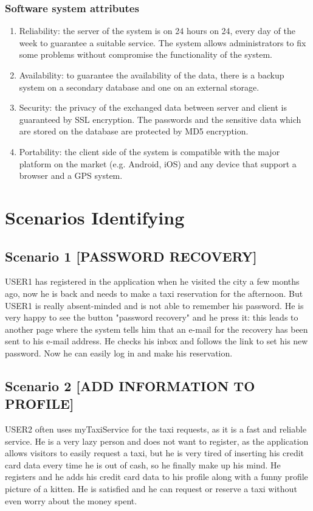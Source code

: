 \documentclass[18pt,oneside,a4paper, titlepage]{article}
\begin{document}
		\subsubsection{Software system attributes}
			\begin{enumerate}
				\item Reliability: the server of the system is on 24 hours on 24, every day of the week to guarantee a suitable service. The system allows administrators to fix some problems without compromise the functionality of the system.
				\item Availability: to guarantee the availability of the data, there is a backup system on a secondary database and one on an external storage. 
				\item Security: the privacy of the exchanged data between server and client is guaranteed by SSL encryption. The passwords and the sensitive data which are stored on the database are protected by MD5 encryption.
				\item Portability: the client side of the system is compatible with the major platform on the market (e.g. Android, iOS) and any device that support a browser and a GPS system.
			\end{enumerate}
\newpage
\section{Scenarios Identifying}
	\subsection{Scenario 1 [PASSWORD RECOVERY]}
		USER1 has registered in the application when he visited the city a few months ago, now he is back and needs to make a taxi reservation for the afternoon. But USER1 is really absent-minded and is not able to remember his password. He is very happy to see the button "password recovery" and he press it: this leads to another page where the system tells him that an e-mail for the recovery has been sent to his e-mail address. He checks his inbox and follows the link to set his new password. Now he can easily log in and make his reservation.
		
	\subsection{Scenario 2 [ADD INFORMATION TO PROFILE]}
		USER2 often uses myTaxiService for the taxi requests, as it is a fast and reliable service. He is a very lazy person and does not want to register, as the application allows visitors to easily request a taxi, but he is very tired of inserting his credit card data every time he is out of cash, so he finally make up his mind. He registers and he adds his credit card data to his profile along with a funny profile picture of a kitten. He is satisfied and he can request or reserve a taxi without even worry about the money spent.
	
\end{document}
